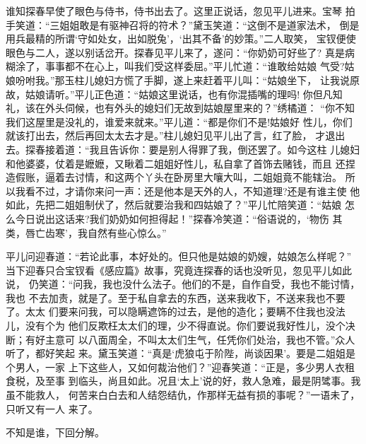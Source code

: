 谁知探春早使了眼色与侍书，侍书出去了。这里正说话，忽见平儿进来。宝琴
拍手笑道：“三姐姐敢是有驱神召将的符术？”黛玉笑道：“这倒不是道家法术，
倒是用兵最精的所谓‘守如处女，出如脱兔’，‘出其不备’的妙策。”二人取笑，
宝钗便使眼色与二人，遂以别话岔开。探春见平儿来了，遂问：“你奶奶可好些了?
真是病糊涂了，事事都不在心上，叫我们受这样委屈。”平儿忙道：“谁敢给姑娘
气受?姑娘吩咐我。”那玉柱儿媳妇方慌了手脚，遂上来赶着平儿叫：“姑娘坐下，
让我说原故，姑娘请听。”平儿正色道：“姑娘这里说话，也有你混插嘴的理吗!
你但凡知礼，该在外头伺候，也有外头的媳妇们无故到姑娘屋里来的？”绣橘道：
“你不知我们这屋里是没礼的，谁爱来就来。”平儿道：“都是你们不是!姑娘好
性儿，你们就该打出去，然后再回太太去才是。”柱儿媳妇见平儿出了言，红了脸，
才退出去。探春接着道：“我且告诉你：要是别人得罪了我，倒还罢了。如今这柱
儿媳妇和他婆婆，仗着是嬷嬷，又瞅着二姐姐好性儿，私自拿了首饰去赌钱，而且
还捏造假账，逼着去讨情，和这两个丫头在卧房里大嚷大叫，二姐姐竟不能辖治。
所以我看不过，才请你来问一声：还是他本是天外的人，不知道理?还是有谁主使
他如此，先把二姐姐制伏了，然后就要治我和四姑娘了？”平儿忙陪笑道：“姑娘
怎么今日说出这话来?我们奶奶如何担得起！”探春冷笑道：“俗语说的，‘物伤
其类，唇亡齿寒’，我自然有些心惊么。”

平儿问迎春道：“若论此事，本好处的。但只他是姑娘的奶嫂，姑娘怎么样呢？”
当下迎春只合宝钗看《感应篇》故事，究竟连探春的话也没听见，忽见平儿如此说，
仍笑道：“问我，我也没什么法子。他们的不是，自作自受，我也不能讨情，我也
不去加责，就是了。至于私自拿去的东西，送来我收下，不送来我也不要了。太太
们要来问我，可以隐瞒遮饰的过去，是他的造化；要瞒不住我也没法儿，没有个为
他们反欺枉太太们的理，少不得直说。你们要说我好性儿，没个决断；有好主意可
以八面周全，不叫太太们生气，任凭你们处治，我也不管。”众人听了，都好笑起
来。黛玉笑道：“真是‘虎狼屯于阶陛，尚谈因果’。要是二姐姐是个男人，一家
上下这些人，又如何裁治他们？”迎春笑道：“正是，多少男人衣租食税，及至事
到临头，尚且如此。况且‘太上’说的好，救人急难，最是阴骘事。我虽不能救人，
何苦来白白去和人结怨结仇，作那样无益有损的事呢？”一语未了，只听又有一人
来了。

不知是谁，下回分解。